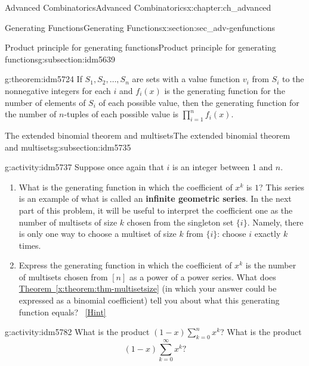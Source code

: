 \documentclass[oneside,10pt,]{book}
\newcommand{\terminology}[1]{\textbf{#1}}
\numberwithin{equation}{chapter}
\begin{document}
\begin{chapterptx}{Advanced Combinatorics}{}{Advanced Combinatorics}{}{}{x:chapter:ch_advanced}
\begin{sectionptx}{Generating Functions}{}{Generating Functions}{}{}{x:section:sec_adv-genfunctions}
\begin{subsectionptx}{Product principle for generating functions}{}{Product principle for generating functions}{}{}{g:subsection:idm5639}
\begin{theorem}{}{}{g:theorem:idm5724}%
If \(S_1,S_2,\dots,S_n\) are sets with a value function \(v_i\) from \(S_i\) to the nonnegative integers for each \(i\) and \(f_i(x)\) is the generating function for the number of elements of \(S_i\) of each possible value, then the generating function for the number of \(n\)-tuples of each possible value is \(\prod_{i=1}^n f_i(x)\).%
\end{theorem}
\end{subsectionptx}
%
%
\typeout{************************************************}
\typeout{************************************************}
%
\begin{subsectionptx}{The extended binomial theorem and multisets}{}{The extended binomial theorem and multisets}{}{}{g:subsection:idm5735}
\begin{activity}{}{g:activity:idm5737}%
Suppose once again that \(i\) is an integer between 1 and \(n\).%
\begin{enumerate}[font=\bfseries,label=(\alph*),ref=\alph*]
\item{}What is the generating function in which the coefficient of \(x^k\) is \(1\)? This series is an example of what is called an \terminology{infinite geometric series}. In the next part of this problem, it will be useful to interpret the coefficient one as the number of multisets of size \(k\) chosen from the singleton set \(\{i\}\). Namely, there is only one way to choose a multiset of size \(k\) from \(\{i\}\): choose \(i\) exactly \(k\) times.%
\item{}Express the generating function in which the coefficient of \(x^k\) is the number of multisets chosen from \([n]\) as a power of a power series.  What does \hyperref[x:theorem:thm-multisetsize]{Theorem~\ref{x:theorem:thm-multisetsize}} (in which your answer could be expressed as a binomial coefficient) tell you about what this generating function equals?%
\qquad~\hfill{\tiny\hyperlink{g:hint:idm5768-back}{[Hint]}}\end{enumerate}
\end{activity}
\begin{activity}{}{g:activity:idm5782}%
What is the product \((1-x)\sum_{k=0}^n x^k\)? What is the product%
\begin{equation*}
(1-x)\sum_{k=0}^\infty x^k?
\end{equation*}
%
\end{activity}

\end{subsectionptx}
\end{sectionptx}
\end{chapterptx}
\end{document}
